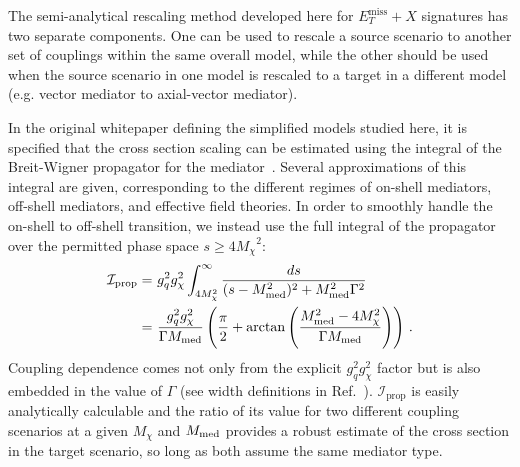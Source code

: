 \documentclass[a4paper, 11pt,notoc]{article}
\newcommand{\MET}{\ensuremath{E_T^\mathrm{miss}}\xspace}
\newcommand{\mDM}{\ensuremath{M_{\chi}}\xspace}
\newcommand{\mMed}{\ensuremath{M_{\rm{med}}}\xspace}
\newcommand{\metplusx}{\ensuremath{\MET+X}\xspace}
\begin{document}
The semi-analytical rescaling method developed here for \metplusx signatures has two separate components. One can be used to rescale a source scenario to another set of couplings within the same overall model, while the other should be used when the source scenario in one model is rescaled to a target in a different model (e.g. vector mediator to axial-vector mediator).

In the original whitepaper defining the simplified models studied here, it is specified that the cross section scaling can be estimated using the integral of the Breit-Wigner propagator for the mediator~\cite{Abercrombie:2015wmb}. Several approximations of this integral are given, corresponding to the different regimes of on-shell mediators, off-shell mediators, and effective field theories. In order to smoothly handle the on-shell to off-shell transition, we instead use the full integral of the propagator over the permitted phase space $s \geq 4 \mDM^2$:
\begin{align}
\mathcal{I}_{\text{prop}} =&\  g_q^2 g_\chi^2 \int_{4\mDM^2}^{\infty} \frac{ds}{(s-\mMed^2)^2+\mMed^2\Gamma^2} \\
=&\  \frac{g_q^2 g_\chi^2}{\Gamma\mMed} \left(\frac{\pi}{2} + \arctan{\left(\frac{\mMed^2 - 4 \mDM^2}{\Gamma\mMed}\right)} \right)\,.
\end{align}
Coupling dependence comes not only from the explicit $g_q^2 g_\chi^2$ factor but is also embedded in the value of $\Gamma$ (see width definitions in Ref.~\cite{Albert:2017onk}).
$\mathcal{I}_{\text{prop}}$ is easily analytically calculable and the ratio of its value for two different coupling scenarios at a given \mDM and \mMed provides a robust estimate of the cross section in the target scenario, so long as both assume the same mediator type.
\end{document}
